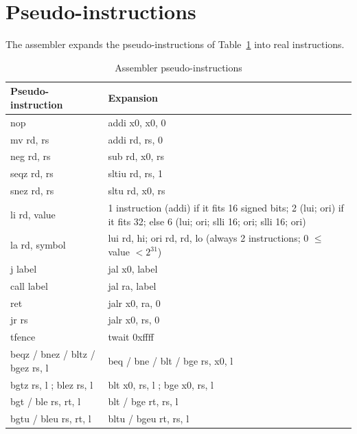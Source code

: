 \section{Pseudo-instructions}

The assembler expands the pseudo-instructions of Table~\ref{tab:pseudo} into real instructions.

\begin{table}[htbp]
\centering\small
\caption{Assembler pseudo-instructions}\label{tab:pseudo}
\begin{tabularx}{\linewidth}{@{}>{\ttfamily}l >{\ttfamily}X@{}}
\toprule
\textrm{\bfseries Pseudo-instruction} & \textrm{\bfseries Expansion}\\\midrule
nop & addi x0, x0, 0\\
mv rd, rs & addi rd, rs, 0\\
neg rd, rs & sub rd, x0, rs\\
seqz rd, rs & sltiu rd, rs, 1\\
snez rd, rs & sltu rd, x0, rs\\
li rd, value & \textrm{1 instruction (}addi\textrm{) if it fits 16 signed bits; 2 (}lui; ori\textrm{) if it fits 32; else 6 (}lui; ori; slli 16; ori; slli 16; ori\textrm{)}\\
la rd, symbol & lui rd, hi; ori rd, rd, lo \textrm{(always 2 instructions; 0 $\le$ value $<2^{31}$)}\\
j label & jal x0, label\\
call label & jal ra, label\\
ret & jalr x0, ra, 0\\
jr rs & jalr x0, rs, 0\\
tfence & twait 0xffff\\
beqz / bnez / bltz / bgez rs, l & beq / bne / blt / bge rs, x0, l\\
bgtz rs, l \textrm{;} blez rs, l & blt x0, rs, l \textrm{;} bge x0, rs, l\\
bgt / ble rs, rt, l & blt / bge rt, rs, l\\
bgtu / bleu rs, rt, l & bltu / bgeu rt, rs, l\\
\bottomrule
\end{tabularx}
\end{table}
